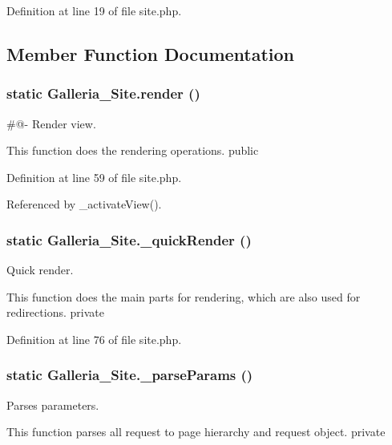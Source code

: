 Definition at line 19 of file site.php.

\subsection{Member Function Documentation}
\subsubsection{\setlength{\rightskip}{0pt plus 5cm}static Galleria\_\-Site.render ()\hspace{0.3cm}{\tt  [static]}}\label{classGalleria__Site_0205e9ec939ea924e25e3650e7a19b70}


\#@- Render view.

This function does the rendering operations.  public 

Definition at line 59 of file site.php.

Referenced by \_\-activateView().
\subsubsection{\setlength{\rightskip}{0pt plus 5cm}static Galleria\_\-Site.\_\-quickRender ()\hspace{0.3cm}{\tt  [static, protected]}}\label{classGalleria__Site_7a8c28e40e6a5f3ac9896378c29d3e54}


Quick render.

This function does the main parts for rendering, which are also used for redirections.  private 

Definition at line 76 of file site.php.
\subsubsection{\setlength{\rightskip}{0pt plus 5cm}static Galleria\_\-Site.\_\-parseParams ()\hspace{0.3cm}{\tt  [static, protected]}}\label{classGalleria__Site_e0ce26478006db25f6b28f9763217e5a}


Parses parameters.

This function parses all request to page hierarchy and request object.  private

